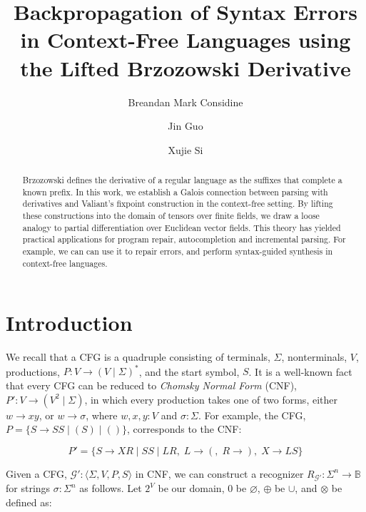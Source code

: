 \documentclass[sigplan,nonacm]{acmart}\settopmatter{printfolios=false,printccs=false,printacmref=false}
\begin{document}
  \title{Backpropagation of Syntax Errors in Context-Free Languages using the Lifted Brzozowski Derivative}
  \begin{abstract}
    Brzozowski defines the derivative of a regular language as the suffixes that complete a known prefix. In this work, we establish a Galois connection between parsing with derivatives and Valiant's fixpoint construction in the context-free setting. By lifting these constructions into the domain of tensors over finite fields, we draw a loose analogy to partial differentiation over Euclidean vector fields. This theory has yielded practical applications for program repair, autocompletion and incremental parsing. For example, we can can use it to repair errors, and perform syntax-guided synthesis in context-free languages.
  \end{abstract}

  \author{Breandan Mark Considine}

  \author{Jin Guo}

  \author{Xujie Si}

  \maketitle

  \section{Introduction}

  We recall that a CFG is a quadruple consisting of terminals, $\Sigma$, nonterminals, $V$, productions, $P: V \rightarrow (V \mid \Sigma)^*$, and the start symbol, $S$. It is a well-known fact that every CFG can be reduced to \textit{Chomsky Normal Form} (CNF), $P': V \rightarrow (V^2 \mid \Sigma)$, in which every production takes one of two forms, either $w \rightarrow xy$, or $w \rightarrow \sigma$, where $w, x, y: V$ and $\sigma: \Sigma$. For example, the CFG, $P=\{S \rightarrow S S \mid ( S ) \mid ()\}$, corresponds to the CNF:\vspace{-10pt}

  \[
    P'=\{S\rightarrow XR \mid SS \mid LR,\; L \rightarrow (,\; R \rightarrow ),\; X\rightarrow LS\}
  \]

  \noindent Given a CFG, $\mathcal{G}' : \langle \Sigma, V, P, S\rangle$ in CNF, we can construct a recognizer $R_{\mathcal{G}'}: \Sigma^n \rightarrow \mathbb{B}$ for strings $\sigma: \Sigma^n$ as follows. Let $2^V$ be our domain, $0$ be $\varnothing$, $\oplus$ be $\cup$, and $\otimes$ be defined as:\vspace{-10pt}
\end{document}
